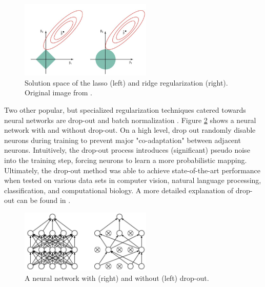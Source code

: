 \begin{figure}[H]
    \centering
    \includegraphics[width=0.56\textwidth]{images/ch1/L1_vs_L2.JPG}
    \caption{Solution space of the lasso (left) and ridge regularization (right). Original image from \cite{generic_stats}.}
    \label{fig:01l1vsl2}
\end{figure}   

Two other popular, but specialized regularization techniques catered towards neural networks are drop-out and batch normalization \cite{dropout, batch_norm}. Figure \ref{fig:01dropout} shows a neural network with and without drop-out. On a high level, drop out randomly disable neurons during training to prevent major "co-adaptation" between adjacent neurons. Intuitively, the drop-out process introduces (significant) pseudo noise into the training step, forcing neurons to learn a more probabilistic mapping. Ultimately, the drop-out method was able to achieve state-of-the-art performance when tested on various data sets in computer vision, natural language processing, classification, and computational biology. A more detailed explanation of drop-out can be found in \cite{dropout}.   

\begin{figure}[H]
    \centering
    \includegraphics[width=0.56\textwidth]{images/ch1/dropout.jpg}
    \caption{A neural network with (right) and without (left) drop-out.}
    \label{fig:01dropout}
\end{figure}  

